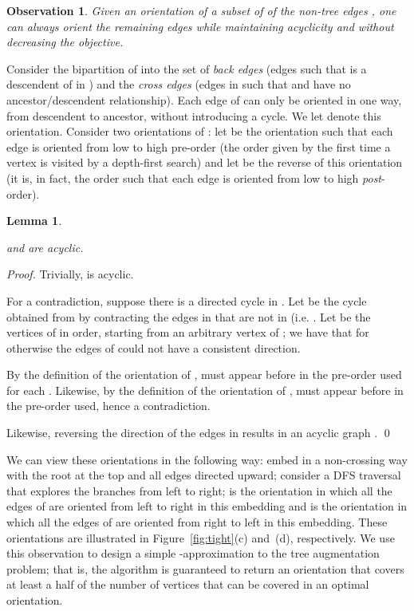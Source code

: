 \documentclass{article}
\newtheorem{lemma}[theorem]{Lemma}
\newtheorem{obs}[theorem]{Observation}
\begin{document}
\begin{obs} \label{obs:complete} Given an orientation of a subset of
   of the non-tree edges , one can always orient the remaining
  edges  while maintaining acyclicity and without decreasing 
  the objective.
\end{obs}

Consider the bipartition of  into the set of {\em back edges} 
(edges  such that  is a descendent of  in
) and the {\em cross edges}  (edges  in  such that  and   have no ancestor/descendent relationship).  Each edge of  can
only be oriented in one way, from descendent to ancestor, without
introducing a cycle.  We let  denote this
orientation.  
Consider two orientations of : let  be the
orientation such that each edge  is oriented from low to
high pre-order (the order given by the first time a vertex is visited
by a depth-first search) and let  be the reverse of
this orientation (it is, in fact, the order such that each edge  is oriented from low to high {\em post}-order).

\begin{lemma}\label{lem:acyc}
  
and  are acyclic.
\end{lemma}

\begin{proof}
  Trivially,  is acyclic.

  For a contradiction, suppose there is a directed cycle  in .  Let  be the cycle obtained from  by contracting the edges in  that are not in  (i.e. .  Let  be the vertices of  in order, starting from an arbitrary vertex  of ; we have that  for otherwise the edges of  could not have a consistent direction.

  By the definition of the orientation of ,  must appear before  in the pre-order used for each .  Likewise, by the definition of the orientation of ,  must appear before  in the pre-order used, hence a contradiction.

  Likewise, reversing the direction of the edges in  results in an acyclic graph . \qed
\end{proof}

We can view these orientations in the
following way: embed  in a non-crossing way with
the root at the top and all edges directed upward; consider a DFS
traversal that explores the branches from left to right;  is the orientation in which all the edges of  are oriented from
left to right in this embedding and  is the
orientation in which all the edges of  are oriented from right to
left in this embedding. These orientations are illustrated in Figure~\ref{fig:tight}(c) and~(d), respectively.  We use this observation to design a simple -approximation to the {\sc tree augmentation} problem; that is, the algorithm is guaranteed to return an orientation that covers at least a half of the number of vertices that can be covered in an optimal orientation.
\end{document}
